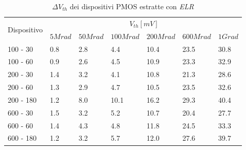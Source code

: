 \documentclass[12pt, letterpaper]{book}
\begin{document}
\begin{table}[H]
  \renewcommand{\arraystretch}{1.3}
  \begin{tabular}{m{2cm}  m{1.1cm} m{1.3cm} m{1.5cm} m{1.5cm} m{1.5cm} m{1cm}}
    \toprule
    \multirow{2}{*}{Dispositivo} & \multicolumn{6}{c}{$V_{th} [mV] $}                                                          \\
    \cmidrule{2-7}
                                 & $5Mrad$                            & $50Mrad$ & $100Mrad$ & $200Mrad$ & $600Mrad$ & $1Grad$ \\
    \midrule
    100 - 30                     & 0.8                                & 2.8      & 4.4       & 10.4      & 23.5      & 30.8    \\
    \hline
    100 - 60                     & 0.9                                & 2.6      & 4.5       & 10.9      & 23.3      & 32.9    \\
    \hline
    200 - 30                     & 1.4                                & 3.2      & 4.1       & 10.8      & 21.3      & 28.6    \\
    \hline
    200 - 60                     & 1.3                                & 2.9      & 4.7       & 10.5      & 23.5      & 32.6    \\
    \hline
    200 - 180                    & 1.2                                & 8.0      & 10.1      & 16.2      & 29.3      & 40.4    \\
    \hline
    600 - 30                     & 1.5                                & 3.2      & 5.2       & 10.7      & 20.4      & 27.7    \\
    \hline
    600 - 60                     & 1.4                                & 4.3      & 4.8       & 11.8      & 24.5      & 33.3    \\
    \hline
    600 - 180                    & 1.2                                & 3.2      & 5.7       & 12.0      & 27.6      & 39.7    \\
    \bottomrule
  \end{tabular}
  \caption{$\Delta V_{th}$ dei dispositivi PMOS estratte con \emph{ELR}}
  \label{tab:deltaVthELRP}
\end{table}
\end{document}
